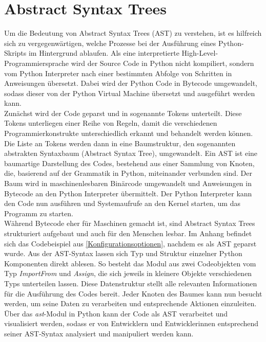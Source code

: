 \documentclass[german,bachelor]{swsLeipzig}
\begin{document}
\section{Abstract Syntax Trees}
Um die Bedeutung von Abstract Syntax Trees (AST) zu verstehen, ist es hilfreich sich zu vergegenwärtigen, welche Prozesse
bei der Ausführung eines Python-Skripts im Hintergrund ablaufen.
Als eine interpretierte High-Level-Programmiersprache wird der Source Code in Python nicht kompiliert, sondern vom
Python Interpreter nach einer bestimmten Abfolge von Schritten in Anweisungen übersetzt.
Dabei wird der Python Code in Bytecode umgewandelt, sodass dieser von der Python Virtual Machine
übersetzt und ausgeführt werden kann. \\

Zunächst wird der Code geparst und in sogenannte Tokens unterteilt.
Diese Tokens unterliegen einer Reihe von Regeln, damit die verschiedenen Programmierkonstrukte unterschiedlich erkannt
und behandelt werden können.
Die Liste an Tokens werden dann in eine Baumstruktur, den sogenannten abstrakten Syntaxbaum (Abstract Syntax Tree), umgewandelt.
Ein AST ist eine baumartige Darstellung des Codes, bestehend aus einer Sammlung von Knoten, die, basierend auf der Grammatik
in Python, miteinander verbunden sind.
Der Baum wird in maschinenlesbaren Binärcode umgewandelt und Anweisungen in Bytecode an den Python Interpreter übermittelt.
Der Python Interpreter kann den Code nun ausführen und Systemaufrufe an den Kernel starten, um das Programm zu starten. \\

Während Bytecode eher für Maschinen gemacht ist, sind Abstract Syntax Trees strukturiert aufgebaut und auch für den Menschen lesbar.
Im Anhang befindet sich das Codebeispiel aus \ref{Konfigurationsoptionen}, nachdem es als AST geparst wurde.
Aus der AST-Syntax lassen sich Typ und Struktur einzelner Python Komponenten direkt ablesen.
So besteht das Modul aus zwei Codeobjekten vom Typ \textit{ImportFrom} und \textit{Assign}, die sich jeweils in kleinere
Objekte verschiedenen Typs unterteilen lassen.
Diese Datenstruktur stellt alle relevanten Informationen für die Ausführung des Codes bereit.
Jeder Knoten des Baumes kann nun besucht werden, um seine Daten zu verarbeiten und entsprechende Aktionen einzuleiten.
Über das \textit{ast}-Modul in Python kann der Code als AST verarbeitet und visualisiert werden, sodass er von
Entwicklern und Entwicklerinnen entsprechend seiner AST-Syntax analysiert und manipuliert werden kann.\\
\end{document}
